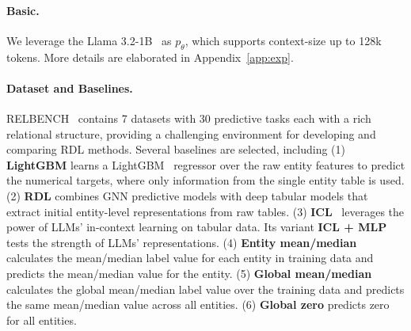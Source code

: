 \documentclass[11pt]{article}
\begin{document}
\paragraph{Basic.} We leverage the Llama 3.2-1B~\citep{touvron2023Llama} as $p_\theta$, which supports context-size up to 128k tokens. More details are elaborated in Appendix~\ref{app:exp}.

\paragraph{Dataset and Baselines.} RELBENCH~\citep{robinson2024relbench} contains 7 datasets with 30 predictive tasks each with a rich relational structure, providing a challenging environment for developing and comparing RDL methods. Several baselines are selected, including (1) \textbf{LightGBM} learns a LightGBM~\citep{ke2017lightgbm} regressor over the raw entity features to predict the numerical targets, where only information from the single entity table is used. (2) \textbf{RDL} combines GNN predictive models with deep tabular models that extract initial entity-level representations from raw tables. (3) \textbf{ICL}~\citep{wydmuch2024tackling} leverages the power of LLMs' in-context learning on tabular data. Its variant \textbf{ICL + MLP} tests the strength of LLMs' representations. (4) \textbf{Entity mean/median} calculates the mean/median label value for each entity in training data and predicts the mean/median value for the entity. (5) \textbf{Global mean/median} calculates the global mean/median label value over the training data and predicts the same mean/median value across all entities. (6) \textbf{Global zero} predicts zero for all entities.
\end{document}

